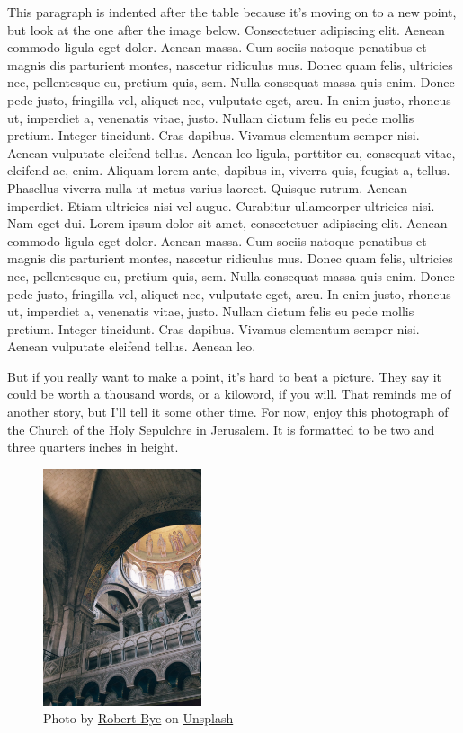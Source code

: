 \documentclass[
    12pt,
    letterpaper,
    oneside,
    noraggedright
]{turabian-researchpaper}
\begin{document}
This paragraph is indented after the table because it's moving on to a
new point, but look at the one after the image below. Consectetuer
adipiscing elit. Aenean commodo ligula eget dolor. Aenean massa. Cum
sociis natoque penatibus et magnis dis parturient montes, nascetur
ridiculus mus. Donec quam felis, ultricies nec, pellentesque eu, pretium
quis, sem. Nulla consequat massa quis enim. Donec pede justo, fringilla
vel, aliquet nec, vulputate eget, arcu. In enim justo, rhoncus ut,
imperdiet a, venenatis vitae, justo. Nullam dictum felis eu pede mollis
pretium. Integer tincidunt. Cras dapibus. Vivamus elementum semper nisi.
Aenean vulputate eleifend tellus. Aenean leo ligula, porttitor eu,
consequat vitae, eleifend ac, enim. Aliquam lorem ante, dapibus in,
viverra quis, feugiat a, tellus. Phasellus viverra nulla ut metus varius
laoreet. Quisque rutrum. Aenean imperdiet. Etiam ultricies nisi vel
augue. Curabitur ullamcorper ultricies nisi. Nam eget dui. Lorem ipsum
dolor sit amet, consectetuer adipiscing elit. Aenean commodo ligula eget
dolor. Aenean massa. Cum sociis natoque penatibus et magnis dis
parturient montes, nascetur ridiculus mus. Donec quam felis, ultricies
nec, pellentesque eu, pretium quis, sem. Nulla consequat massa quis
enim. Donec pede justo, fringilla vel, aliquet nec, vulputate eget,
arcu. In enim justo, rhoncus ut, imperdiet a, venenatis vitae, justo.
Nullam dictum felis eu pede mollis pretium. Integer tincidunt. Cras
dapibus. Vivamus elementum semper nisi. Aenean vulputate eleifend
tellus. Aenean leo.

But if you really want to make a point, it's hard to beat a picture.
They say it could be worth a thousand words, or a kiloword, if you will.
That reminds me of another story, but I'll tell it some other time. For
now, enjoy this photograph of the Church of the Holy Sepulchre in
Jerusalem. It is formatted to be two and three quarters inches in
height.

\begin{figure}
\centering
\includegraphics[width=\textwidth,height=2.75in]{./images/robert-bye-W4V4vtq36NU-unsplash.jpg}
\caption{Photo by
\href{https://unsplash.com/@robertbye?utm_source=unsplash\&utm_medium=referral\&utm_content=creditCopyText}{Robert
Bye} on
\href{https://unsplash.com/s/photos/jerusalem?utm_source=unsplash\&utm_medium=referral\&utm_content=creditCopyText}{Unsplash}}
\end{figure}
\end{document}
